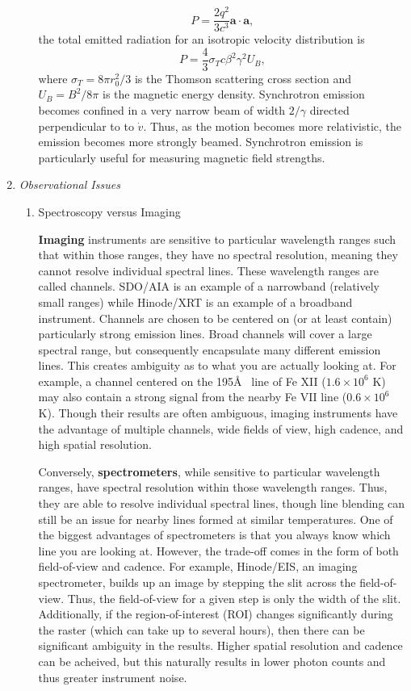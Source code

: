 \begin{enumerate}
\begin{enumerate}
				\begin{equation}
					P=\frac{2q^2}{3c^3}\mathbf{a}\cdot\mathbf{a},
				\end{equation}
				the total emitted radiation for an isotropic velocity distribution is
				\begin{equation}
					P=\frac{4}{3}\sigma_Tc\beta^2\gamma^2U_B,
				\end{equation}
				where $\sigma_T=8\pi r_0^2/3$ is the Thomson scattering cross section and $U_B=B^2/8\pi$ is the magnetic energy density. Synchrotron emission becomes confined in a very narrow beam of width $2/\gamma$ directed perpendicular to to $\dot{v}$. Thus, as the motion becomes more relativistic, the emission becomes more strongly beamed. Synchrotron emission is particularly useful for measuring magnetic field strengths. 
			\end{enumerate}
			\item{\em Observational Issues}
			\begin{enumerate}
				\item{Spectroscopy versus Imaging}
				\par \textbf{Imaging} instruments are sensitive to particular wavelength ranges such that within those ranges, they have no spectral resolution, meaning they cannot resolve individual spectral lines. These wavelength ranges are called channels. SDO/AIA is an example of a narrowband (relatively small ranges) while Hinode/XRT is an example of a broadband instrument. Channels are chosen to be centered on (or at least contain) particularly strong emission lines. Broad channels will cover a large spectral range, but consequently encapsulate many different emission lines. This creates ambiguity as to what you are actually looking at. For example, a channel centered on the 195\AA~ line of Fe XII ($1.6\times10^6$ K) may also contain a strong signal from the nearby Fe VII line ($0.6\times10^6$ K). Though their results are often ambiguous, imaging instruments have the advantage of multiple channels, wide fields of view, high cadence, and high spatial resolution. 
				\par Conversely, \textbf{spectrometers}, while sensitive to particular wavelength ranges, have spectral resolution within those wavelength ranges. Thus, they are able to resolve individual spectral lines, though line blending can still be an issue for nearby lines formed at similar temperatures. One of the biggest advantages of spectrometers is that you always know which line you are looking at. However, the trade-off comes in the form of both field-of-view and cadence. For example, Hinode/EIS, an imaging spectrometer, builds up an image by stepping the slit across the field-of-view. Thus, the field-of-view for a given step is only the width of the slit. Additionally, if the region-of-interest (ROI) changes significantly during the raster (which can take up to several hours), then there can be significant ambiguity in the results. Higher spatial resolution and cadence can be acheived, but this naturally results in lower photon counts and thus greater instrument noise. 

\end{enumerate}
\end{enumerate}
